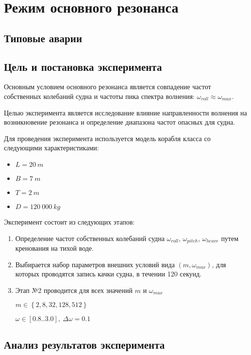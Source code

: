 \section{Режим основного резонанса}

\subsection{Типовые аварии}


\subsection{Цель и постановка эксперимента}

Основным условием основного резонанса является совпадение частот собственных колебаний судна и частоты пика спектра волнения: $\omega_{roll} \approx \omega_{max}$.

Целью эксперимента является исследование влияние направленности волнения на возникновение резонанса и определение диапазона частот опасных для судна.

Для проведения эксперимента используется модель корабля класса  со следующими характеристиками:
\begin{itemize}
	\item	$L = 20\ m$
	\item	$B = 7\ m$
	\item	$T = 2\ m$
	\item	$D = 120\ 000\ kg$
\end{itemize}

Эксперимент состоит из следующих этапов:
\begin{enumerate}
	\item	Определение частот собственных колебаний судна 
			$\omega_{roll}$, $\omega_{pitch}$, $\omega_{heave}$ путем кренования на тихой воде.
	\item	Выбирается набор параметров внешних условий вида $(m, \omega_{max})$, для которых
			проводятся запись качки судна, в течении 120 секунд.
	\item	Этап №2	проводится для всех значений $m$ и $\omega_{max}$
	
			$m \in \left\lbrace 2,8,32,128,512 \right\rbrace$
			
			$\omega \in [0.8..3.0],\ \Delta\omega=0.1$ 

\end{enumerate}

\subsection{Анализ результатов эксперимента}

